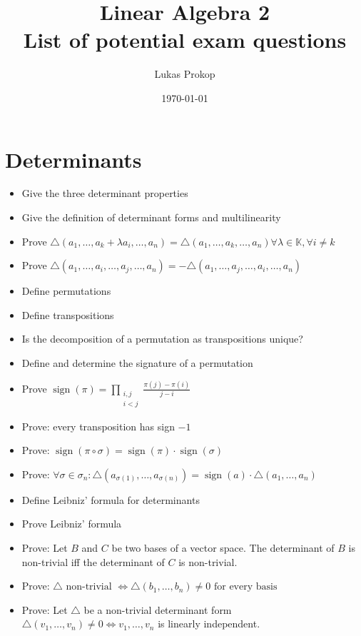 \documentclass[a4paper]{article}
\title{
  Linear Algebra 2 \\
  List of potential exam questions
}
\date{\today}
\author{Lukas Prokop}
\DeclareMathOperator{\sign}{sign}
\begin{document}
\maketitle

\section{Determinants}

\begin{itemize}
  \item Give the three determinant properties
  \item Give the definition of determinant forms and multilinearity
  \item Prove $\triangle(a_1, \dots, a_k + \lambda a_i, \dots, a_n) = \triangle(a_1, \dots, a_k, \dots, a_n) \forall \lambda \in \mathbb K, \forall i \neq k$
  \item Prove $\triangle(a_1, \dots, a_i, \dots, a_j, \dots, a_n) = -\triangle(a_1, \dots, a_j, \dots, a_i, \dots, a_n)$
  \item Define permutations
  \item Define transpositions
  \item Is the decomposition of a permutation as transpositions unique?
  \item Define and determine the signature of a permutation
  \item Prove $\sign(\pi) = \prod_{\substack{i,j \\ i < j}} \frac{\pi(j) - \pi(i)}{j-i}$
  \item Prove: every transposition has sign $-1$
  \item Prove: $\sign(\pi \circ \sigma) = \sign(\pi) \cdot \sign(\sigma)$
  \item Prove: $\forall \sigma \in \sigma_n: \triangle(a_{\sigma(1)}, \dots, a_{\sigma(n)}) = \sign(a) \cdot \triangle(a_1, \dots, a_n)$
  \item Define Leibniz' formula for determinants
  \item Prove Leibniz' formula
  \item Prove: Let $B$ and $C$ be two bases of a vector space. The determinant of $B$ is non-trivial iff the determinant of $C$ is non-trivial.
  \item Prove: $\triangle \text{ non-trivial } \iff \triangle(b_1, \dots, b_n) \neq 0 \text{ for every basis}$
  \item Prove: Let $\triangle$ be a non-trivial determinant form $\triangle(v_1, \dots, v_n) \neq 0 \iff v_1, \dots, v_n$ is linearly independent.

\end{itemize}
\end{document}
